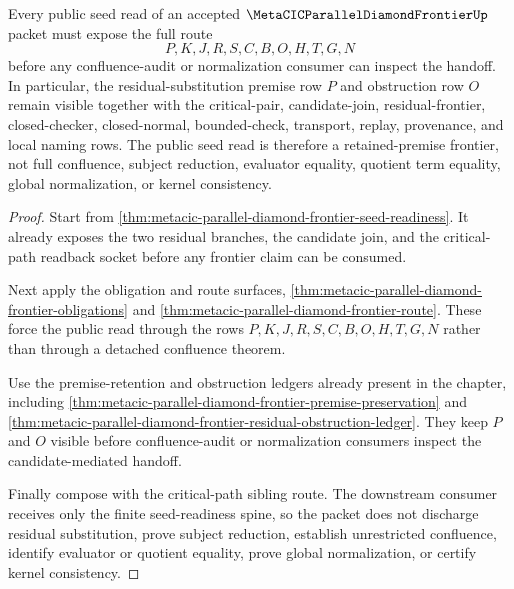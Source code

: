\begin{theorem}
\label{thm:metacic-parallel-diamond-frontier-public-seed-readiness}
Every public seed read of an accepted $\MetaCICParallelDiamondFrontierUp$ packet must expose the full route
$$
P,K,J,R,S,C,B,O,H,T,G,N
$$
before any confluence-audit or normalization consumer can inspect the handoff. In particular, the residual-substitution premise row $P$ and obstruction row $O$ remain visible together with the critical-pair, candidate-join, residual-frontier, closed-checker, closed-normal, bounded-check, transport, replay, provenance, and local naming rows. The public seed read is therefore a retained-premise frontier, not full confluence, subject reduction, evaluator equality, quotient term equality, global normalization, or kernel consistency.
\end{theorem}
\begin{proof}
Start from \autoref{thm:metacic-parallel-diamond-frontier-seed-readiness}. It already exposes the two residual branches, the candidate join, and the critical-path readback socket before any frontier claim can be consumed.

Next apply the obligation and route surfaces, \autoref{thm:metacic-parallel-diamond-frontier-obligations} and \autoref{thm:metacic-parallel-diamond-frontier-route}. These force the public read through the rows $P,K,J,R,S,C,B,O,H,T,G,N$ rather than through a detached confluence theorem.

Use the premise-retention and obstruction ledgers already present in the chapter, including \autoref{thm:metacic-parallel-diamond-frontier-premise-preservation} and \autoref{thm:metacic-parallel-diamond-frontier-residual-obstruction-ledger}. They keep $P$ and $O$ visible before confluence-audit or normalization consumers inspect the candidate-mediated handoff.

Finally compose with the critical-path sibling route. The downstream consumer receives only the finite seed-readiness spine, so the packet does not discharge residual substitution, prove subject reduction, establish unrestricted confluence, identify evaluator or quotient equality, prove global normalization, or certify kernel consistency.
\end{proof}

